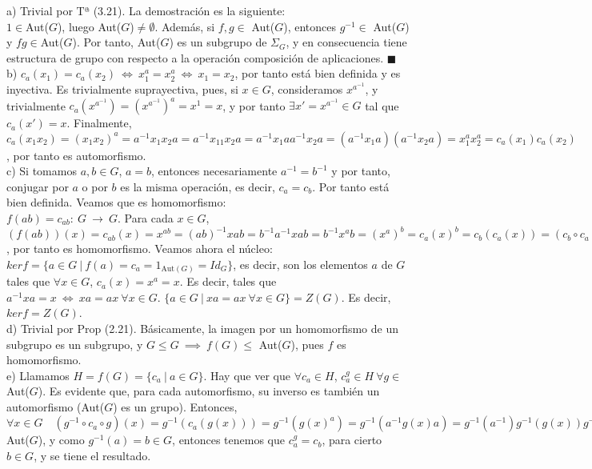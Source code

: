 \documentclass{article}
\begin{document}
a) Trivial por Tª (3.21). La demostración es la siguiente:\\
$1 \in $Aut($G$), luego Aut($G$)$\neq \emptyset$. Además, si $f,g \in $ Aut($G$), entonces $g^{-1} \in $ Aut($G$) y $fg \in $Aut($G$). Por tanto, Aut($G$) es un subgrupo de $\Sigma_G$, y en consecuencia tiene estructura de grupo con respecto a la operación composición de aplicaciones. $\blacksquare$\\
b) $c_a(x_1) = c_a(x_2) \ \iff \ x_1^a = x_2^a \ \iff \ x_1 = x_2$, por tanto está bien definida y es inyectiva. Es trivialmente suprayectiva, pues, si $x \in G$, consideramos $x^{a^{-1}}$, y trivialmente $c_a(x^{a^{-1}}) = (x^{a^{-1}})^{a} = x^1 = x$, y por tanto $\exists x' = x^{a^{-1}} \in G$ tal que $c_a(x') = x$. Finalmente, $c_a(x_1x_2) = (x_1x_2)^a = a^{-1}x_1x_2a = a^{-1}x_11x_2a = a^{-1}x_1aa^{-1}x_2a = (a^{-1}x_1a)(a^{-1}x_2a) = x_1^ax_2^a = c_a(x_1)c_a(x_2)$, por tanto es automorfismo.\\
c) Si tomamos $a,b \in G$, $a = b$, entonces necesariamente $a^{-1} = b^{-1}$ y por tanto, conjugar por $a$ o por $b$ es la misma operación, es decir, $c_a = c_b$. Por tanto está bien definida. Veamos que es homomorfismo:\\
$f(ab) = c_{ab} : \ G \ \longrightarrow \ G$. Para cada $x \in G$, $(f(ab))(x) = c_{ab}(x) = x^{ab} = (ab)^{-1}xab = b^{-1}a^{-1}xab = b^{-1}x^ab = (x^a)^b = c_a(x)^b = c_b(c_a(x)) = (c_b\circ c_a)(x) = (f(a)f(b))(x)$, por tanto es homomorfismo. Veamos ahora el núcleo:\\
$kerf = \{a \in G \ | \ f(a) = c_a = 1_{\text{Aut}(G)} = Id_G\}$, es decir, son los elementos $a$ de $G$ tales que $\forall x \in G$, $c_a(x) = x^a = x$. Es decir, tales que $a^{-1}xa = x \ \iff \ xa = ax \ \forall x \in G$. $\{a \in G \ | \ xa = ax \ \forall x \in G\} = Z(G)$. Es decir, $kerf = Z(G)$.\\
d) Trivial por Prop (2.21). Básicamente, la imagen por un homomorfismo de un subgrupo es un subgrupo, y $G \leqslant G \ \implies \ f(G) \leqslant $ Aut($G$), pues $f$ es homomorfismo.\\
e) Llamamos $H = f(G) = \{c_a \ | \ a \in G\}$. Hay que ver que $\forall c_a \in H$, $c_a^g \in H \ \forall g \in $Aut($G$). Es evidente que, para cada automorfismo, su inverso es también un automorfismo (Aut($G$) es un grupo). Entonces, $\forall x \in G \quad (g^{-1} \circ c_a \circ g)(x) = g^{-1}(c_a(g(x))) = g^{-1}(g(x)^a) = g^{-1}(a^{-1}g(x)a) = g^{-1}(a^{-1})g^{-1}(g(x))g^{-1}(a) = g^{-1}(a)^{-1}g^{-1}(g(x))g^{-1}(a) = g^{-1}(a)^{-1}xg^{-1}(a) = x^{g^{-1}(a)} \quad \forall g\in $Aut($G$), y como $g^{-1}(a) = b \in G$, entonces tenemos que $c_a^g = c_b$, para cierto $b \in G$, y se tiene el resultado.\\
\end{document}
